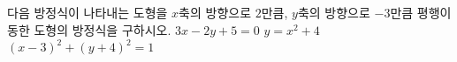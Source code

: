 다음 방정식이 나타내는 도형을 $x$축의 방향으로 $2$만큼, $y$축의 방향으로 $-3$만큼 평행이동한 도형의 방정식을 구하시오.
 $3x-2y+5=0$
 $y=x^2+4$
 $(x-3)^2+(y+4)^2=1$

